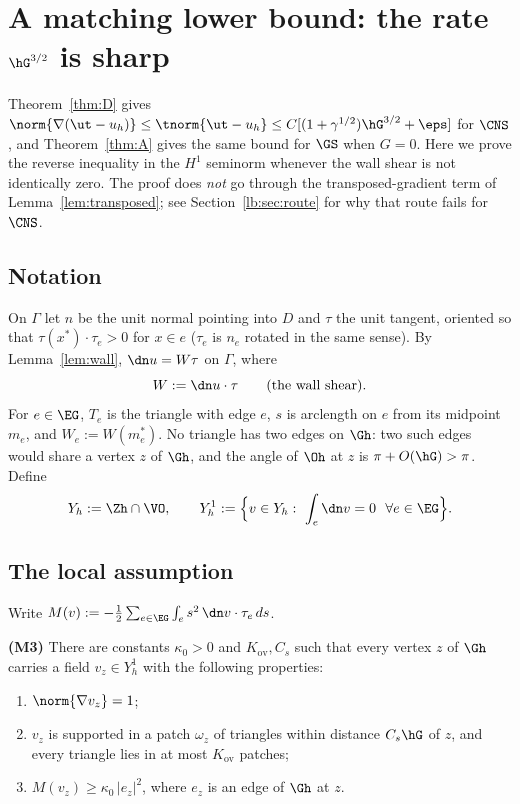 
\section{A matching lower bound: the rate $\hG^{3/2}$ is sharp}\label{lb:sec}

Theorem~\ref{thm:D} gives $\norm{\nabla(\ut-u_h)}\le\tnorm{\ut-u_h}\le C[(1+\gamma^{1/2})\hG^{3/2}+\eps]$ for $\CNS$, and Theorem~\ref{thm:A} gives the same bound for $\GS$ when $G=0$. Here we prove the reverse inequality in the $H^1$ seminorm whenever the wall shear is not identically zero. The proof does \emph{not} go through the transposed-gradient term of Lemma~\ref{lem:transposed}; see Section~\ref{lb:sec:route} for why that route fails for $\CNS$.

\subsection{Notation}
On $\Gamma$ let $n$ be the unit normal pointing into $D$ and $\tau$ the unit tangent, oriented so that $\tau(x^\ast)\cdot\tau_e>0$ for $x\in e$ ($\tau_e$ is $n_e$ rotated in the same sense). By Lemma~\ref{lem:wall}, $\dn u=W\tau$ on $\Gamma$, where
\[
W:=\dn u\cdot\tau\qquad\text{(the wall shear)}.
\]
For $e\in\EG$, $T_e$ is the triangle with edge $e$, $s$ is arclength on $e$ from its midpoint $m_e$, and $W_e:=W(m_e^\ast)$. No triangle has two edges on $\Gh$: two such edges would share a vertex $z$ of $\Gh$, and the angle of $\Oh$ at $z$ is $\pi+O(\hG)>\pi$. Define
\[
Y_h:=\Zh\cap\VO,\qquad Y_h^1:=\Bigl\{v\in Y_h:\ \int_e\dn v=0\ \ \forall e\in\EG\Bigr\}.
\]

\subsection{The local assumption}
Write $M(v):=-\tfrac12\sum_{e\in\EG}\int_e s^2\,\dn v\cdot\tau_e\,ds$.

\begin{assumption}\label{lb:ass}
\textbf{(M3)} There are constants $\kappa_0>0$ and $K_{\mathrm{ov}},C_s$ such that every vertex $z$ of $\Gh$ carries a field $v_z\in Y_h^1$ with the following properties:
\begin{enumerate}[label=(\roman*)]
\item $\norm{\nabla v_z}=1$;
\item $v_z$ is supported in a patch $\omega_z$ of triangles within distance $C_s\hG$ of $z$, and every triangle lies in at most $K_{\mathrm{ov}}$ patches;
\item $M(v_z)\ge\kappa_0\,|e_z|^2$, where $e_z$ is an edge of $\Gh$ at $z$.
\end{enumerate}
\end{assumption}

